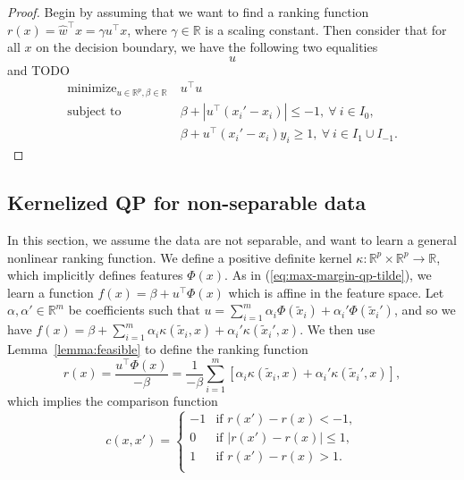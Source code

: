 \documentclass{article}
\newcommand{\RR}{\mathbb R}
\DeclareMathOperator*{\minimize}{minimize}
\begin{document}
\begin{proof}
  Begin by assuming that we want to find a ranking function $r(x)=\hat
  w^\intercal x = \gamma u^\intercal x$, where $\gamma\in\RR$ is a
  scaling constant.  Then consider that for all $x$ on the decision
  boundary, we have the following two equalities
  \begin{equation}
    \label{eq:dec-boundary-rank}
    u
  \end{equation}
and TODO
\begin{equation}
  \label{eq:max-margin-qp}
  \begin{aligned}
    \minimize_{u\in\RR^p, \beta\in\RR}\ & u^\intercal u  \\
    \text{subject to}\ & \beta + |u^\intercal (x_i'-x_i)| \leq -1,\
    \forall\  i\in I_0,\\
    & \beta + u^\intercal(x_i'-x_i)y_i \geq 1,\ \forall\ i\in I_1\cup I_{-1}.
  \end{aligned}
\end{equation}
\end{proof}


\subsection{Kernelized QP for non-separable data}
\label{sec:kernelized-qp}
In this section, we assume the data are not separable, and want to
learn a general nonlinear ranking function. We define a positive
definite kernel $\kappa:\RR^p\times \RR^p\rightarrow\RR$, which
implicitly defines features $\Phi(x)$. As in
(\ref{eq:max-margin-qp-tilde}), we learn a function $f(x)=\beta +
u^\intercal \Phi(x)$ which is affine in the feature space. Let
$\alpha,\alpha'\in\RR^m$ be coefficients such that $u=\sum_{i=1}^m
\alpha_i \Phi(\tilde x_i) + \alpha_i' \Phi(\tilde x_i')$, and so we
have
 $f(x) =\beta + \sum_{i=1}^m \alpha_i \kappa(\tilde x_i, x) +
\alpha_i' \kappa(\tilde x_i', x)$. We then use Lemma~\ref{lemma:feasible} to
define the ranking function
\begin{equation}
  \label{eq:kernelized_r}
  r(x)= \frac{u^\intercal \Phi(x)}{-\beta} = \frac{1}{-\beta}
  \sum_{i=1}^m \left[
    \alpha_i \kappa(\tilde x_i, x) + \alpha_i'  \kappa(\tilde x_i', x) 
  \right],
\end{equation}
which implies the comparison function
\begin{equation}
  \label{eq:kernelized_c}
  c(x, x') =
  \begin{cases}
    -1 & \text{if } r(x') - r(x) < -1, \\
    0 & \text{if } |r(x') - r(x)| \leq 1, \\
    1 & \text{if } r(x') - r(x) > 1. \\
  \end{cases}
\end{equation}
\end{document}
